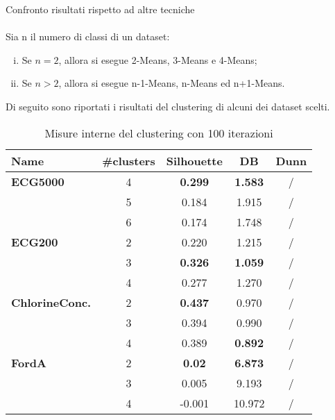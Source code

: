 Confronto risultati rispetto ad altre tecniche\\
\\
Sia n il numero di classi di un dataset:
\begin{enumerate}[(i)]
	\item Se $n=2$, allora si esegue 2-Means, 3-Means e 4-Means;
	\item Se $n>2$, allora si esegue n-1-Means, n-Means ed n+1-Means.
\end{enumerate}

Di seguito sono riportati i risultati del clustering di alcuni dei dataset scelti.
\begin{table}[H]
	\centering
	\begin{tabularx}{\textwidth}{X | c c c c}
		\hline
		\textbf{Name} & \textbf{\#clusters} & \textbf{Silhouette} & \textbf{DB} & \textbf{Dunn} \\
		\hline
		\textbf{ECG5000} & 4 & \textbf{0.299} & \textbf{1.583} & / \\
		& 5 & 0.184 & 1.915 & / \\
		& 6 & 0.174 & 1.748 & / \\
		\hline
		\textbf{ECG200} & 2 & 0.220 & 1.215 & / \\
		& 3 & \textbf{0.326} & \textbf{1.059} & / \\
		& 4 & 0.277 & 1.270 & / \\
		\hline
		\textbf{ChlorineConc.} & 2 & \textbf{0.437} & 0.970 & / \\
		& 3 & 0.394 & 0.990 & / \\
		& 4 & 0.389 & \textbf{0.892} & / \\
		\hline
		\textbf{FordA} & 2 & \textbf{0.02} & \textbf{6.873} & / \\
		& 3 & 0.005 & 9.193 & / \\
		& 4 & -0.001 & 10.972 & / \\
	\end{tabularx}
	\caption{Misure interne del clustering con 100 iterazioni}
	\label{tab:clustering100_int}
\end{table}

